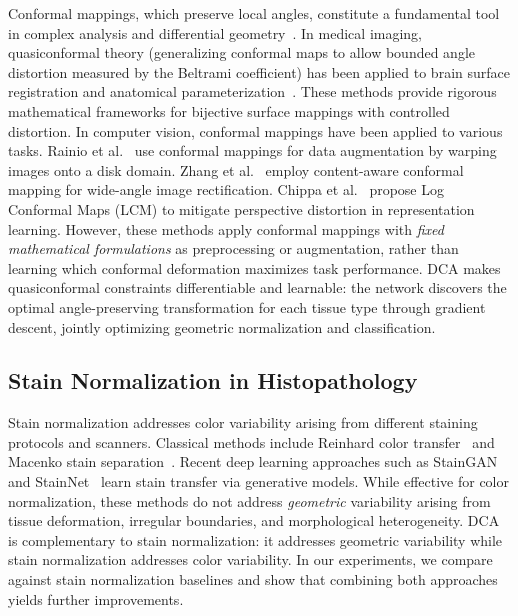 \documentclass[final,3p,times,review,sort&compress]{elsarticle}
\begin{document}
Conformal mappings, which preserve local angles, constitute a fundamental tool in complex analysis and differential geometry~\cite{ahlfors2006conformal}. In medical imaging, quasiconformal theory (generalizing conformal maps to allow bounded angle distortion measured by the Beltrami coefficient) has been applied to brain surface registration and anatomical parameterization~\cite{wang2015quasiconformal,lui2014brain}. These methods provide rigorous mathematical frameworks for bijective surface mappings with controlled distortion. In computer vision, conformal mappings have been applied to various tasks. Rainio et al.~\cite{rainio2023conformal} use conformal mappings for data augmentation by warping images onto a disk domain. Zhang et al.~\cite{zhang2023conformal} employ content-aware conformal mapping for wide-angle image rectification. Chippa et al.~\cite{chippa2024lcm} propose Log Conformal Maps (LCM) to mitigate perspective distortion in representation learning. However, these methods apply conformal mappings with \textit{fixed mathematical formulations} as preprocessing or augmentation, rather than learning which conformal deformation maximizes task performance. DCA makes quasiconformal constraints differentiable and learnable: the network discovers the optimal angle-preserving transformation for each tissue type through gradient descent, jointly optimizing geometric normalization and classification.

\subsection{Stain Normalization in Histopathology}

Stain normalization addresses color variability arising from different staining protocols and scanners. Classical methods include Reinhard color transfer~\cite{reinhard2001color} and Macenko stain separation~\cite{macenko2009method}. Recent deep learning approaches such as StainGAN~\cite{shaban2019staingan} and StainNet~\cite{kang2021stainnet} learn stain transfer via generative models. While effective for color normalization, these methods do not address \textit{geometric} variability arising from tissue deformation, irregular boundaries, and morphological heterogeneity. DCA is complementary to stain normalization: it addresses geometric variability while stain normalization addresses color variability. In our experiments, we compare against stain normalization baselines and show that combining both approaches yields further improvements.
\end{document}
